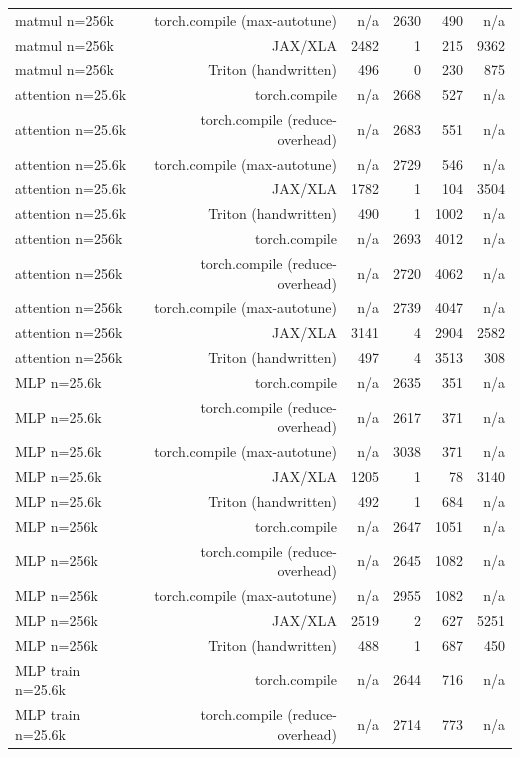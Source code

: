\begin{tabular}{lrrrrr}
matmul n=256k & torch.compile (max-autotune) & n/a & 2630 & 490 & n/a \\
matmul n=256k & JAX/XLA & 2482 & 1 & 215 & 9362 \\
matmul n=256k & Triton (handwritten) & 496 & 0 & 230 & 875 \\
attention n=25.6k & torch.compile & n/a & 2668 & 527 & n/a \\
attention n=25.6k & torch.compile (reduce-overhead) & n/a & 2683 & 551 & n/a \\
attention n=25.6k & torch.compile (max-autotune) & n/a & 2729 & 546 & n/a \\
attention n=25.6k & JAX/XLA & 1782 & 1 & 104 & 3504 \\
attention n=25.6k & Triton (handwritten) & 490 & 1 & 1002 & n/a \\
attention n=256k & torch.compile & n/a & 2693 & 4012 & n/a \\
attention n=256k & torch.compile (reduce-overhead) & n/a & 2720 & 4062 & n/a \\
attention n=256k & torch.compile (max-autotune) & n/a & 2739 & 4047 & n/a \\
attention n=256k & JAX/XLA & 3141 & 4 & 2904 & 2582 \\
attention n=256k & Triton (handwritten) & 497 & 4 & 3513 & 308 \\
MLP n=25.6k & torch.compile & n/a & 2635 & 351 & n/a \\
MLP n=25.6k & torch.compile (reduce-overhead) & n/a & 2617 & 371 & n/a \\
MLP n=25.6k & torch.compile (max-autotune) & n/a & 3038 & 371 & n/a \\
MLP n=25.6k & JAX/XLA & 1205 & 1 & 78 & 3140 \\
MLP n=25.6k & Triton (handwritten) & 492 & 1 & 684 & n/a \\
MLP n=256k & torch.compile & n/a & 2647 & 1051 & n/a \\
MLP n=256k & torch.compile (reduce-overhead) & n/a & 2645 & 1082 & n/a \\
MLP n=256k & torch.compile (max-autotune) & n/a & 2955 & 1082 & n/a \\
MLP n=256k & JAX/XLA & 2519 & 2 & 627 & 5251 \\
MLP n=256k & Triton (handwritten) & 488 & 1 & 687 & 450 \\
MLP train n=25.6k & torch.compile & n/a & 2644 & 716 & n/a \\
MLP train n=25.6k & torch.compile (reduce-overhead) & n/a & 2714 & 773 & n/a \\

\end{tabular}
